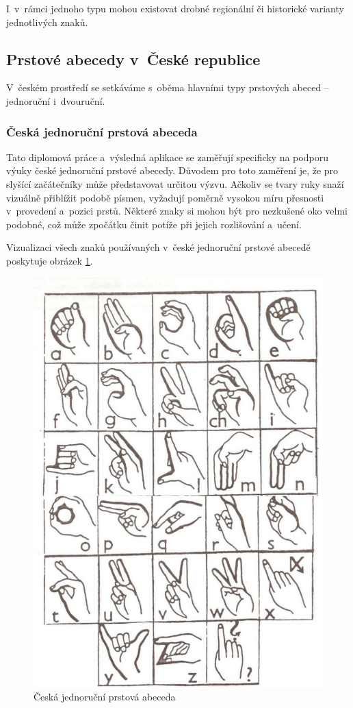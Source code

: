 \documentclass[
  master,
  program=ainfvs,
  biblatex,
  figures=true,
  tables=false,
  sourcecodes=true,
  glossaries,
  index
]{kidiplom}
\begin{document}
    I~v~rámci jednoho typu mohou existovat drobné regionální či historické varianty jednotlivých znaků.

    \subsection{Prstové abecedy v~České republice}
    
        V~českém prostředí se setkáváme s~oběma hlavními typy prstových abeced – jednoruční i~dvouruční.
    
        \subsubsection{Česká jednoruční prstová abeceda}
        
            Tato diplomová práce a~výsledná aplikace se zaměřují specificky na podporu výuky české jednoruční prstové abecedy. Důvodem pro toto zaměření je, že pro slyšící začátečníky může představovat určitou výzvu. Ačkoliv se tvary ruky snaží vizuálně přiblížit podobě písmen, vyžadují poměrně vysokou míru přesnosti v~provedení a~pozici prstů. Některé znaky si mohou být pro nezkušené oko velmi podobné, což může zpočátku činit potíže při jejich rozlišování a~učení. 
        
        
            Vizualizaci všech znaků používaných v~české jednoruční prstové abecedě poskytuje obrázek \ref{prstova-abeceda}.
        
        \begin{figure}[htbp]
            \centering
            \includegraphics[width=0.5\columnwidth]{graphics/prstova-abeceda.png}
            \caption{Česká jednoruční prstová abeceda \cite{prstova-abeceda}}
            \label{prstova-abeceda}
        \end{figure}
        
\end{document}
